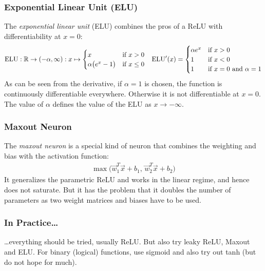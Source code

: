 		\subsubsection{Exponential Linear Unit (ELU)}
			The \emph{exponential linear unit} (ELU) combines the pros of a ReLU with differentiability at \(x = 0\):
			\begin{align}
				\mathrm{ELU} : \mathbb{R} \to (-\alpha, \infty) : x \mapsto
				\begin{cases}
					x                          & \text{if } x > 0    \\
					\alpha \big( e^x - 1 \big) & \text{if } x \leq 0
				\end{cases} &  &
				\mathrm{ELU}'(x) =
				\begin{cases}
					\alpha e^x & \text{if } x > 0                         \\
					1          & \text{if } x < 0                         \\
					1          & \text{if } x = 0 \text{ and } \alpha = 1
				\end{cases}
			\end{align}
			As can be seen from the derivative, if \(\alpha = 1\) is chosen, the function is continuously differentiable everywhere. Otherwise it is not differentiable at \(x = 0\). The value of \(\alpha\) defines the value of the ELU as \(x \to -\infty\).

		\subsubsection{Maxout Neuron}
			The \emph{maxout neuron} is a special kind of neuron that combines the weighting and bias with the activation function:
			\begin{align}
				\max\bigl( \vec{w}_1^T \vec{x} + b_1,\, \vec{w}_2^T \vec{x} + b_2 \bigr)
			\end{align}
			It generalizes the parametric ReLU and works in the linear regime, and hence does not saturate. But it has the problem that it doubles the number of parameters as two weight matrices and biases have to be used.

		\subsubsection{In Practice\dots}
			\dots everything should be tried, usually ReLU. But also try leaky ReLU, Maxout and ELU. For binary (logical) functions, use sigmoid and also try out tanh (but do not hope for much).

